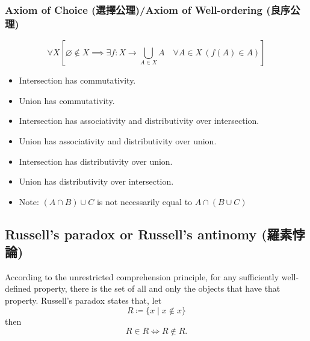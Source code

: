 \documentclass[a4paper,12pt]{report}
\begin{document}
\begin{itemizle}
\subsubsection{Axiom of Choice (選擇公理)/Axiom of Well-ordering (良序公理)}
\[ \forall X\left[\varnothing \notin X\implies \exists f\colon X\rightarrow \bigcup _{A\in X}A\quad \forall A\in X\,(f(A)\in A)\right]\]
\begin{itemize}
\item Intersection has commutativity.
\item Union has commutativity.
\item Intersection has associativity and distributivity over intersection.
\item Union has associativity and distributivity over union.
\item Intersection has distributivity over union.
\item Union has distributivity over intersection.
\item Note: $(A\cap B)\cup C$ is not necessarily equal to $A\cap (B\cup C)$
\end{itemize}
\subsection{Russell's paradox or Russell's antinomy (羅素悖論)}
According to the unrestricted comprehension principle, for any sufficiently well-defined property, there is the set of all and only the objects that have that property. Russell's paradox states that, let
\[R\coloneq\{x\mid x\not \in x\}\]
then
\[R\in R\iff R\not \in R.\]


\end{itemizle}
\end{document}
